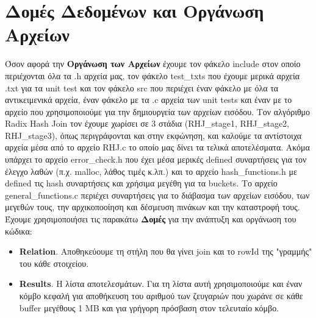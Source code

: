 \documentclass[12pt, a4paper]{article}
\begin{document}
\section{Δομές Δεδομένων και Οργάνωση Αρχείων}
Όσον αφορά την \textbf{Οργάνωση των Αρχείων} έχουμε τον φάκελο include στον οποίο περιέχονται όλα τα .h αρχεία μας, τον φάκελο test\_txts που έχουμε μερικά αρχεία .txt για τα unit test και τον φάκελο src που περιέχει έναν φάκελο με όλα τα αντικειμενικά αρχεία, έναν φάκελο με τα .c αρχεία των unit tests και έναν με το αρχείο που χρησιμοποιούμε για την δημιουργεία των αρχείων εισόδου. Τον αλγόριθμο Radix Hash Join τον έχουμε χωρίσει σε 3 στάδια (RHJ\_stage1, RHJ\_stage2, RHJ\_stage3), όπως περιγράφονται και στην εκφώνηση, και καλούμε τα αντίστοιχα αρχεία μέσα από το αρχείο RHJ.c το οποίο μας δίνει τα τελικά αποτελέσματα. Aκόμα υπάρχει το αρχείο error\_check.h που έχει μέσα μερικές defined συναρτήσεις για τον έλεγχο λαθών (π.χ. malloc, λάθος τιμές κ.λπ.) και το αρχείο hash\_functions.h με defined τις hash συναρτήσεις και χρήσιμα μεγέθη για τα buckets. Το αρχείο general\_functions.c περιέχει συναρτήσεις για το διάβασμα των αρχείων εισόδου, των μεγεθών τους, την αρχικοποοίηση και δέσμευση πινάκων και την καταστροφή τους.\\
Έχουμε χρησιμοποιήσει τις παρακάτω \textbf{Δομές} για την ανάπτυξη και οργάνωση του κώδικα:
\begin{itemize}
	\item \textbf{Relation}. Αποθηκεύουμε τη στήλη που θα γίνει join και το rowId της "γραμμής" του κάθε στοιχείου.
	\item \textbf{Results}. Η λίστα αποτελεσμάτων. Για τη λίστα αυτή χρησιμοποιούμε και έναν κόμβο κεφαλή για αποθήκευση του αριθμού των ζευγαριών που χωράνε σε κάθε buffer μεγέθους 1 MB και για γρήγορη πρόσβαση στον τελευταίο κόμβο.
\end{itemize}
\end{document}
